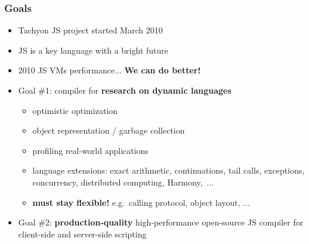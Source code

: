 \begin{frame}
\frametitle{\bf Goals}

  \begin{itemize}

  \item Tachyon JS project started March 2010
    \smallskip

  \item JS is a key language with a bright future
    \smallskip

  \item 2010 JS VMs performance... {\bf We can do better!}
    \smallskip

    \bigskip

  \item Goal \#1: compiler for {\bf research on dynamic languages}
    \begin{itemize}
    \item optimistic optimization
    \item object representation / garbage collection
    \item profiling real-world applications
    \item language extensions: exact arithmetic, continuations, tail calls, exceptions, concurrency, distributed computing, Harmony,~...
    \item {\bf must stay flexible!} e.g.~calling protocol, object layout, ...
    \end{itemize}
    \smallskip

  \item Goal \#2: {\bf production-quality} high-performance open-source
    JS compiler for client-side and server-side scripting

  \end{itemize}

\end{frame}

